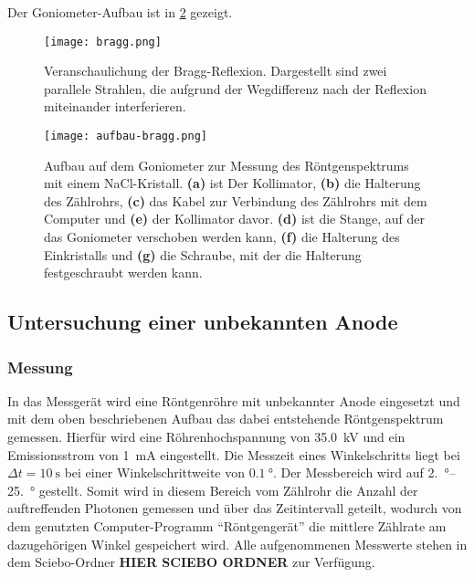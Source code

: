 Der Goniometer-Aufbau ist in \cref{fig:aufbau-bragg} gezeigt.

\begin{figure}[htb]
	\centering
	\texttt{[image: bragg.png]}
	\caption{Veranschaulichung der Bragg-Reflexion. Dargestellt sind zwei parallele Strahlen,
		die aufgrund der Wegdifferenz nach der Reflexion miteinander interferieren.}
	\label{fig:bragg}
\end{figure}

\newcommand\ebf[1]{\textbf{(#1)}}
\begin{figure}[htb]
	\centering
	\texttt{[image: aufbau-bragg.png]}
	\caption{Aufbau auf dem Goniometer zur Messung des Röntgenspektrums mit einem NaCl-Kristall. \ebf a ist 
	Der Kollimator, \ebf b die Halterung des Zählrohrs, \ebf c das Kabel zur Verbindung des Zählrohrs mit 
	dem Computer und \ebf e der Kollimator davor. \ebf d ist die Stange, auf der das Goniometer verschoben
	werden kann, \ebf f die Halterung des Einkristalls und \ebf g die Schraube, mit der die Halterung 
	festgeschraubt werden kann.}
	\label{fig:aufbau-bragg}
\end{figure}

\subsection{Untersuchung einer unbekannten Anode}\label{sec:unbekannte_anode}
\subsubsection{Messung}
In das Messgerät wird eine Röntgenröhre mit unbekannter Anode eingesetzt und mit dem oben beschriebenen Aufbau
das dabei entstehende Röntgenspektrum gemessen. Hierfür wird eine Röhrenhochspannung von \SI{35.0}{\kilo\volt} und
ein Emissionsstrom von \SI{1}{\milli\ampere} eingestellt. Die Messzeit eines Winkelschritts liegt bei
$\Delta t = \SI{10}{\second}$
bei einer Winkelschrittweite von $\SI{0.1}{\degree}$. Der Messbereich wird auf \qtyrange{2.}{25.}{\degree} gestellt.
Somit wird in diesem Bereich vom Zählrohr die Anzahl der auftreffenden Photonen gemessen
und über das Zeitintervall geteilt, wodurch von dem genutzten Computer-Programm
\enquote{Röntgengerät} die mittlere Zählrate am dazugehörigen Winkel gespeichert wird. Alle
aufgenommenen Messwerte stehen in dem Sciebo-Ordner \textbf{HIER SCIEBO ORDNER}
zur Verfügung.

